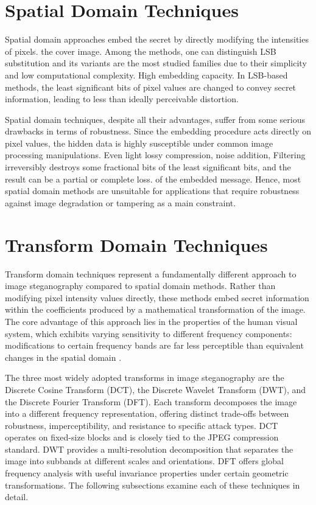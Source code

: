 \documentclass[12pt,a4paper,oneside]{report}
\begin{document}
	\section{Spatial Domain Techniques}
	
	Spatial domain approaches embed the secret by directly modifying the intensities of pixels.
	the cover image. Among the methods, one can distinguish LSB substitution and its variants
	are the most studied families due to their simplicity and low computational complexity.
	High embedding capacity\cite{johnson1998exploring}. In LSB-based methods, the least significant bits of pixel values are
	changed to convey secret information, leading to less than ideally perceivable distortion.
	
	Spatial domain techniques, despite all their advantages, suffer from some serious drawbacks in terms of
	robustness. Since the embedding procedure acts directly on pixel values, the hidden data is
	highly susceptible under common image processing manipulations. Even light lossy compression, noise addition,
	Filtering irreversibly destroys some fractional bits of the least significant bits, and the result can be a partial or complete loss.
	of the embedded message\cite{provos2003hide}. Hence, most spatial domain methods are unsuitable for applications that require robustness against image degradation or tampering as a main constraint.
	
	\section{Transform Domain Techniques}
	
	Transform domain techniques represent a fundamentally different approach to image steganography compared to spatial domain methods. Rather than modifying pixel intensity values directly, these methods embed secret information within the coefficients produced by a mathematical transformation of the image. The core advantage of this approach lies in the properties of the human visual system, which exhibits varying sensitivity to different frequency components: modifications to certain frequency bands are far less perceptible than equivalent changes in the spatial domain \cite{cox2007digital}.
	
	The three most widely adopted transforms in image steganography are the Discrete Cosine Transform (DCT), the Discrete Wavelet Transform (DWT), and the Discrete Fourier Transform (DFT). Each transform decomposes the image into a different frequency representation, offering distinct trade-offs between robustness, imperceptibility, and resistance to specific attack types. DCT operates on fixed-size blocks and is closely tied to the JPEG compression standard. DWT provides a multi-resolution decomposition that separates the image into subbands at different scales and orientations. DFT offers global frequency analysis with useful invariance properties under certain geometric transformations. The following subsections examine each of these techniques in detail.
	
\end{document}
